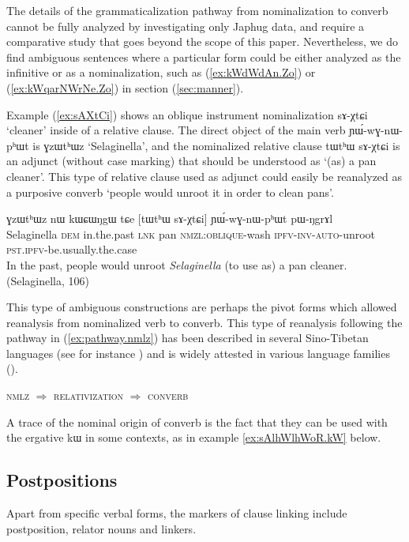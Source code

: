 \documentclass[oldfontcommands,oneside,a4paper,11pt]{article}
\newcommand{\ipa}[1]{{\phon \mbox{#1}}} %
\newcommand{\refb}[1]{(\ref{#1})}
\begin{document}
The details of the grammaticalization pathway from nominalization to converb cannot be fully analyzed by investigating only Japhug data, and require a comparative study that goes beyond the scope of this paper. Nevertheless, we do find ambiguous  sentences where a particular form could be either analyzed as the infinitive or as a nominalization, such as \refb{ex:kWdWdAn.Zo} or \refb{ex:kWqarNWrNe.Zo} in section \refb{sec:manner}. 

Example \refb{ex:sAXtCi} shows an oblique instrument nominalization \ipa{sɤ-χtɕi}  `cleaner' inside of a relative clause. The direct object of the main verb   	\ipa{ɲɯ́-wɣ-nɯ-pʰɯt} is \ipa{ɣzɯtʰɯz} `Selaginella', and the nominalized relative clause \ipa{tɯtʰɯ}  	\ipa{sɤ-χtɕi}  is an adjunct (without case marking) that should be understood as `(as) a pan cleaner'. This type of relative clause used as adjunct could easily be reanalyzed as a purposive converb `people would unroot it in order to clean pans'.

\begin{exe}
\ex \label{ex:sAXtCi}
\gll
\ipa{ɣzɯtʰɯz}  	\ipa{nɯ}  	\ipa{kɯɕɯŋgɯ}  	\ipa{tɕe}  	[\ipa{tɯtʰɯ}  	\ipa{sɤ-χtɕi}]  	\ipa{ɲɯ́-wɣ-nɯ-pʰɯt}  	\ipa{pɯ-ŋgrɤl}  \\
Selaginella \textsc{dem} in.the.past \textsc{lnk} pan \textsc{nmzl:oblique}-wash \textsc{ipfv-inv-auto}-unroot \textsc{pst.ipfv}-be.usually.the.case \\
\glt In the past, people would unroot \textit{Selaginella} (to use as) a pan cleaner. (Selaginella, 106)
\end{exe}

This type of ambiguous constructions are perhaps the pivot forms which allowed reanalysis from nominalized verb to converb. This type of reanalysis following the pathway in \refb{ex:pathway.nmlz}  has been described in several Sino-Tibetan languages (see for instance \citealt{coupe07mongsen}) and is  widely attested in various language families (\citealt{epps09converb}).

\begin{exe}
\ex \label{ex:pathway.nmlz}
\glt \textsc{nmlz} $\Rightarrow$  \textsc{relativization} $\Rightarrow$  \textsc{converb}  
\end{exe}

A trace of the nominal origin of converb is the fact that they can be used with the ergative \ipa{kɯ} in some contexts, as in example \ref{ex:sAlhWlhWoR.kW} below.

\subsection{Postpositions}  \label{sec:postp}
Apart from specific verbal forms, the markers of clause linking include postposition, relator nouns and linkers.
\end{document}
